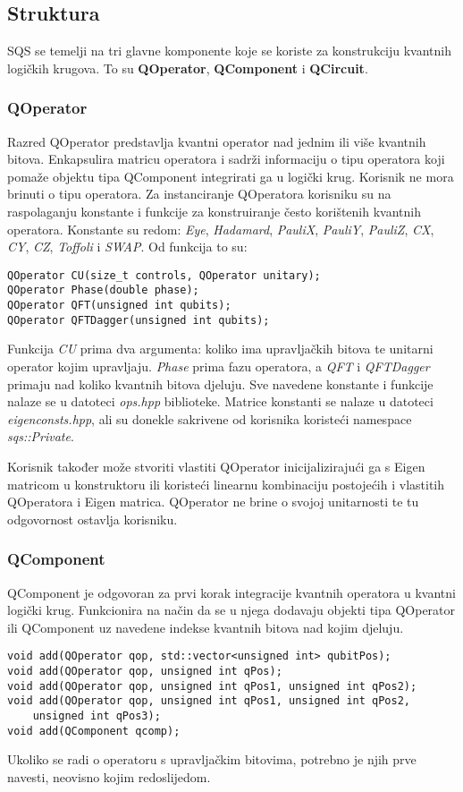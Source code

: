 \subsection{Struktura}

SQS se temelji na tri glavne komponente koje se koriste za konstrukciju kvantnih logičkih krugova. To su \textbf{QOperator}, \textbf{QComponent} i \textbf{QCircuit}.

\subsubsection{QOperator}
Razred QOperator predstavlja kvantni operator nad jednim ili više kvantnih bitova. Enkapsulira matricu operatora i sadrži informaciju o tipu operatora koji pomaže objektu tipa QComponent integrirati ga u logički krug. Korisnik ne mora brinuti o tipu operatora. Za instanciranje QOperatora korisniku su na raspolaganju konstante i funkcije za konstruiranje često korištenih kvantnih operatora. Konstante su redom: \textit{Eye}, \textit{Hadamard}, \textit{PauliX}, \textit{PauliY}, \textit{PauliZ}, \textit{CX}, \textit{CY}, \textit{CZ}, \textit{Toffoli} i \textit{SWAP}. Od funkcija to su:
\lstset{language=c++, tabsize=4}
\begin{lstlisting}
QOperator CU(size_t controls, QOperator unitary);
QOperator Phase(double phase);
QOperator QFT(unsigned int qubits);
QOperator QFTDagger(unsigned int qubits);
\end{lstlisting}
Funkcija \textit{CU} prima dva argumenta: koliko ima upravljačkih bitova te unitarni operator kojim upravljaju. \textit{Phase} prima fazu operatora, a \textit{QFT} i \textit{QFTDagger} primaju nad koliko kvantnih bitova djeluju. Sve navedene konstante i funkcije nalaze se u datoteci \emph{ops.hpp} biblioteke. Matrice konstanti se nalaze u datoteci \emph{eigenconsts.hpp}, ali su donekle sakrivene od korisnika koristeći namespace \emph{sqs::Private}.

Korisnik također može stvoriti vlastiti QOperator inicijalizirajući ga s Eigen matricom u konstruktoru ili koristeći linearnu kombinaciju postojećih i vlastitih QOperatora i Eigen matrica. QOperator ne brine o svojoj unitarnosti te tu odgovornost ostavlja korisniku.

\subsubsection{QComponent}

QComponent je odgovoran za prvi korak integracije kvantnih operatora u kvantni logički krug. Funkcionira na način da se u njega dodavaju objekti tipa QOperator ili QComponent uz navedene indekse kvantnih bitova nad kojim djeluju.
\begin{lstlisting}
void add(QOperator qop, std::vector<unsigned int> qubitPos);
void add(QOperator qop, unsigned int qPos);
void add(QOperator qop, unsigned int qPos1, unsigned int qPos2);
void add(QOperator qop, unsigned int qPos1, unsigned int qPos2,
	unsigned int qPos3);
void add(QComponent qcomp);
\end{lstlisting}
Ukoliko se radi o operatoru s upravljačkim bitovima, potrebno je njih prve navesti, neovisno kojim redoslijedom.

